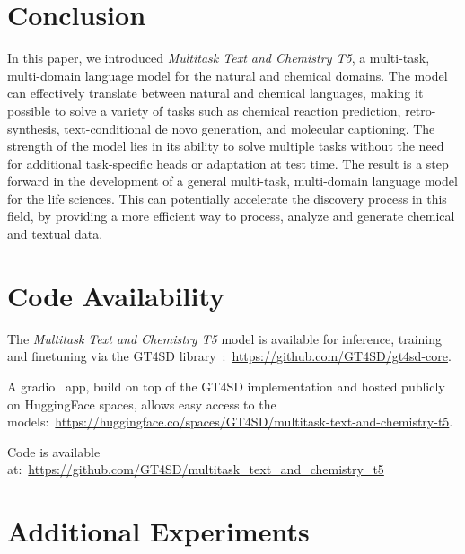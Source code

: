 \documentclass[nohyperref]{article}
\theoremstyle{plain}
\theoremstyle{definition}
\theoremstyle{remark}
\begin{document}
\section{Conclusion}
In this paper, we introduced \textit{Multitask Text and Chemistry T5}, a multi-task, multi-domain language model for the natural and chemical domains. The model can effectively translate between natural and chemical languages, making it possible to solve a variety of tasks such as chemical reaction prediction, retro-synthesis, text-conditional de novo generation, and molecular captioning. The strength of the model lies in its ability to solve multiple tasks without the need for additional task-specific heads or adaptation at test time. The result is a step forward in the development of a general multi-task, multi-domain language model for the life sciences. This can potentially accelerate the discovery process in this field, by providing a more efficient way to process, analyze and generate chemical and textual data.

\section*{Code Availability}

The \emph{Multitask Text and Chemistry T5} model is available for inference, training and finetuning via the GT4SD library~\cite{manica2022gt4sd}:~\url{https://github.com/GT4SD/gt4sd-core}.

A gradio~\cite{abid2019gradio} app, build on top of the GT4SD implementation and hosted publicly on HuggingFace spaces, allows easy access to the models:~\url{https://huggingface.co/spaces/GT4SD/multitask-text-and-chemistry-t5}.

Code is available at:~\url{https://github.com/GT4SD/multitask_text_and_chemistry_t5} 
\small



\newpage
\normalsize
\appendix
\onecolumn
\section{Additional Experiments}
\end{document}
